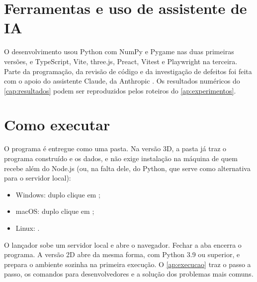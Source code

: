 \section{Ferramentas e uso de assistente de IA}

O desenvolvimento usou Python com NumPy \cite{harris2020} e Pygame nas duas primeiras versões, e TypeScript, Vite, three.js, Preact, Vitest e Playwright na terceira. Parte da programação, da revisão de código e da investigação de defeitos foi feita com o apoio do assistente Claude, da Anthropic \cite{anthropic2026}. Os resultados numéricos do \autoref{cap:resultados} podem ser reproduzidos pelos roteiros do \autoref{ap:experimentos}.

\section{Como executar}

O programa é entregue como uma pasta. Na versão 3D, a pasta já traz o programa construído e os dados, e não exige instalação na máquina de quem recebe além do Node.js (ou, na falta dele, do Python, que serve como alternativa para o servidor local):

\begin{itemize}
  \item Windows: duplo clique em ;
  \item macOS: duplo clique em ;
  \item Linux: .
\end{itemize}

O lançador sobe um servidor local e abre o navegador. Fechar a aba encerra o programa. A versão 2D abre da mesma forma, com Python 3.9 ou superior, e prepara o ambiente sozinha na primeira execução. O \autoref{ap:execucao} traz o passo a passo, os comandos para desenvolvedores e a solução dos problemas mais comuns.
